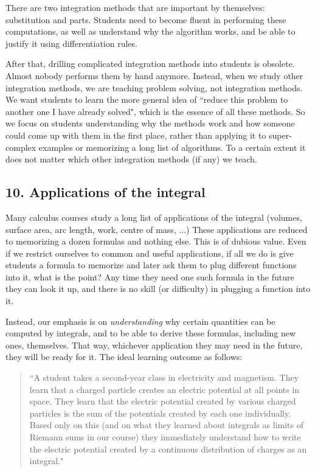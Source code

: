 \documentclass[11pt]{article}
\begin{document}
There are two integration methods that are important by themselves: substitution and parts.  Students need to become fluent in performing these computations, as well as understand why the algorithm works, and be able to justify it using differentiation rules.

{\baselineskip

After that, drilling complicated integration methods into students is obsolete.  Almost nobody performs them by hand anymore.    Instead, when we study other integration methods, we are teaching problem solving, not integration methods.    We want students to learn the more general idea of ``reduce this problem to another one I have already solved", which is the essence of all these methods.  So we focus on students understanding why the methods work and how someone could come up with them in the first place, rather than applying it to super-complex examples or memorizing a long list of algorithms.  To a certain extent it does not matter which other integration methods (if any) we teach.
}

\subsection{10. Applications of the integral} \label{unit10}

Many calculus courses study a long list of applications of the integral (volumes, surface area, arc length, work, centre of mass, ...)  These applications are reduced to memorizing a dozen formulas and nothing else.   This is of dubious value.  Even if we restrict ourselves to common and useful applications, if all we do is give students a formula to memorize and later ask them to plug different functions into it, what is the point?    Any time they need one such formula in the future they can look it up, and there is no skill (or difficulty) in plugging a function into it.

{\baselineskip

Instead, our emphasis is on \emph{understanding} why certain quantities can be computed by integrals, and to be able to derive these formulas, including new ones, themselves.  That way, whichever application they may need in the future, they will be ready for it.  The ideal learning outcome as follows: }

	\begin{quotation}
		``A student takes a second-year class in electricity and magnetism.  They learn that a charged particle creates an electric potential at all points in space.  They learn that the electric potential created by various charged particles is the sum of the potentials created by each one individually.  Based only on this (and on what they learned about integrals as limits of Riemann sums in our course) they immediately understand how to write the electric potential created by a continuous distribution of charges as an integral."
	\end{quotation}
\end{document}
